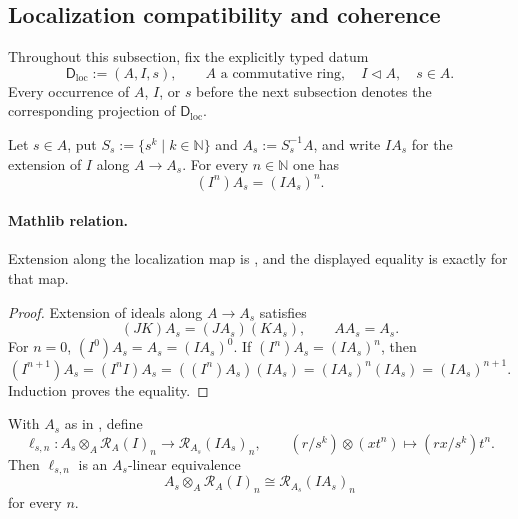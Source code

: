 \subsection{Localization compatibility and coherence}

Throughout this subsection, fix the explicitly typed datum
\[
  \mathsf D_{\mathrm{loc}}:=(A,I,s),\qquad
  A\text{ a commutative ring},\quad I\triangleleft A,\quad s\in A.
                                                                    \tag{LOC0}
\]
Every occurrence of $A$, $I$, or $s$ before the next subsection denotes the
corresponding projection of $\mathsf D_{\mathrm{loc}}$.

\begin{lemma}
  \label{lemma:nagata-localization-ideal-pow}

  Let $s\in A$, put $S_s:=\{s^k\mid k\in\mathbb N\}$ and
  $A_s:=S_s^{-1}A$, and write $IA_s$ for the extension of $I$ along
  $A\to A_s$.  For every $n\in\mathbb N$ one has
  \[
    (I^n)A_s=(IA_s)^n.
  \]

  \paragraph{Mathlib relation.}
  Extension along the localization map is
  \texttt{}, and the displayed equality is exactly
  \texttt{} for that map.
\end{lemma}

\begin{proof}
  Extension of ideals along $A\to A_s$ satisfies
  \[
    (JK)A_s=(JA_s)(KA_s),
    \qquad AA_s=A_s.
  \]
  For $n=0$,
  $(I^0)A_s=A_s=(IA_s)^0$.  If
  $(I^n)A_s=(IA_s)^n$, then
  \[
    (I^{n+1})A_s
      =(I^nI)A_s
      =((I^n)A_s)(IA_s)
      =(IA_s)^n(IA_s)
      =(IA_s)^{n+1}.
  \]
  Induction proves the equality.
\end{proof}

\begin{lemma}
  \label{lemma:nagata-localization-rees-piece}

  With $A_s$ as in , define
  \[
    \ell_{s,n}\colon A_s\otimes_A\mathcal R_A(I)_n
      \longrightarrow\mathcal R_{A_s}(IA_s)_n,
    \qquad
    (r/s^k)\otimes(xt^n)\longmapsto(rx/s^k)t^n.
  \]
  Then $\ell_{s,n}$ is an $A_s$-linear equivalence
  \[
    A_s\otimes_A\mathcal R_A(I)_n
      \cong\mathcal R_{A_s}(IA_s)_n
  \]
  for every $n$.
\end{lemma}

